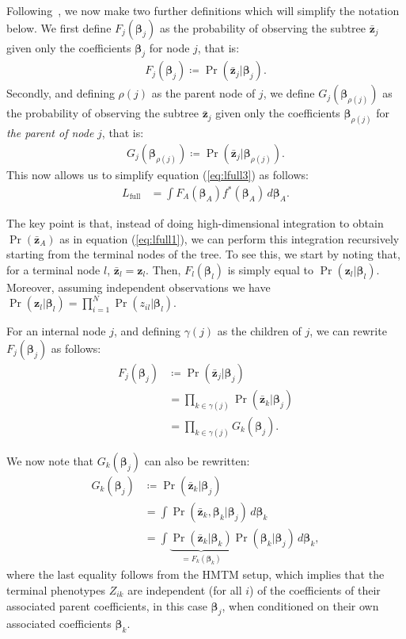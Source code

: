 \documentclass[10pt]{article}
\newcommand{\B}{\symbf{\beta}}
\newcommand{\bz}{\bar{\symbf{z}}}
\begin{document}
Following~\cite{Cortes2017}, we now make two further definitions which will simplify the notation below. We first define $F_j(\B_j)$ as the probability of observing the subtree $\bz_j$ given only the coefficients $\B_j$ for node $j$, that is:
\begin{align*}
  F_j(\B_j) \coloneqq \Pr(\bz_j | \B_j).
\end{align*}
Secondly, and defining $\rho(j)$ as the parent node of $j$, we define $G_j(\B_{\rho(j)})$ as the probability of observing the subtree $\bz_j$ given only the coefficients $\B_{\rho(j)}$ for \textit{the parent of node} $j$, that is:
\begin{align*}
  G_j(\B_{\rho(j)}) \coloneqq \Pr(\bz_j | \B_{\rho(j)}).
\end{align*}
This now allows us to simplify equation (\ref{eq:lfull3}) as follows:
\begin{align*}
  L_\text{full} &= \int F_A(\B_A) f^*(\B_A)  \, d\B_A.
\end{align*}


The key point is that, instead of doing high-dimensional integration to obtain $\Pr(\bz_A)$ as in equation (\ref{eq:lfull1}), we can perform this integration recursively starting from the terminal nodes of the tree. To see this, we start by noting that, for a terminal node $l$, $\bz_l=\symbf{z}_l$. Then, $F_l(\B_l)$ is simply equal to $\Pr(\symbf{z}_l|\B_l)$. Moreover, assuming independent observations we have $\Pr(\symbf{z}_l | \B_l) = \prod_{i=1}^N \Pr(z_{il} | \B_l)$.


For an internal node $j$, and defining $\gamma(j)$ as the children of $j$, we can rewrite $F_j(\B_j)$ as follows:
\begin{align*}
  F_j(\B_j) &\coloneqq \Pr(\bz_j | \B_j) \nonumber\\
            &= \prod_{k\in\gamma(j)} \Pr(\bz_k | \B_j )\\
            &= \prod_{k\in\gamma(j)} G_k(\B_j).
\end{align*}


We now note that $G_k(\B_j)$ can also be rewritten:
\begin{align}
  G_k(\B_j) &\coloneqq \Pr(\bz_k | \B_j) \nonumber\\
            &= \int \Pr(\bz_k,\B_k | \B_j) \,d\B_k \nonumber\\
  &= \int \underbrace{\Pr(\bz_k | \B_k)}_{=F_k(\B_k)} \Pr(\B_k | \B_j)   \,d\B_k, \label{eq:g}
\end{align}
where the last equality follows from the HMTM setup, which implies that the terminal phenotypes $Z_{ik}$ are independent (for all $i$) of the coefficients of their associated parent coefficients, in this case $\B_j$, when conditioned on their own associated coefficients $\B_k$.
\end{document}
